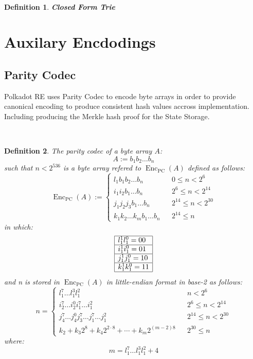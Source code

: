 \documentclass{article}
\newcommand{\assign}{:=}
\newcommand{\cdummy}{\cdot}
\newcommand{\tmop}[1]{\ensuremath{\operatorname{#1}}}
\newcommand{\tmstrong}[1]{\textbf{#1}}
\newtheorem{definition}{Definition}
\begin{document}
\

\begin{definition}
  \label{def-closed-form-trie}{\tmstrong{Closed Form Trie}} {}
\end{definition}

\section{Auxilary Encdodings}

\subsection{Parity Codec}

Polkadot RE uses Parity Codec to encode byte arrays in order to provide
canonical encoding to produce consistent hash values accross implementation.
Including producing the Merkle hash proof for the State Storage.

\

\begin{definition}
  The parity codec of a byte array $A$:
  \[ A \assign b_1 b_2 \ldots b_n \]
  such that $n < 2^{536}$ is a byte array refered to $\tmop{Enc}_{\tmop{PC}}
  (A)$ defined as follows:
  \[ \tmop{Enc}_{\tmop{PC}} (A) \assign \left\{ \begin{array}{lll}
       l^{}_1 b_1 b_2 \ldots b_n &  & 0 \leqslant n < 2^6\\
       i^{}_1 i^{}_2 b_1 \ldots b_n &  & 2^6 \leqslant n < 2^{14}\\
       j^{}_1 j^{}_2 j_3 b_1 \ldots b_n &  & 2^{14} \leqslant n < 2^{30}\\
       k_1^{} k_2^{} \ldots k_m^{} b_1 \ldots b_n &  & 2^{14} \leqslant n
     \end{array} \right. \]
  in which:
  \[ \begin{array}{|l|}
       \hline
       l^1_1 l_1^0 = 00\\
       \hline
       i^1_1 i_1^0 = 01\\
       \hline
       j^1_1 j_1^0 = 10\\
       \hline
       k^1_1 k_1^0 = 11\\
       \hline
     \end{array} \]
  and n is stored in $\tmop{Enc}_{\tmop{PC}} (A)$ in little-endian format in
  base-2 as follows:
  \[ n = \left\{ \begin{array}{lll}
       l^7_1 \ldots l^3_1 l^2_1 &  & n < 2^6\\
       i_2^7 \ldots i_2^0 i_1^7 \ldots i^2_1^{} &  & 2^6 \leqslant n <
       2^{14}\\
       j_4^7 \ldots j_4^0 j_3^7 \ldots j_1^7 \ldots j^2_1 &  & 2^{14}
       \leqslant n < 2^{30}\\
       k_2 + k_3 2^8 + k_4 2^{2 \cdummy 8} + \cdots + k_m 2^{(m - 2) 8} &  &
       2^{30} \leqslant n
     \end{array} \right. \]
  where:
  \[ m = l^7_1 \ldots l^3_1 l^2_1 + 4 \]
\end{definition}
\end{document}
